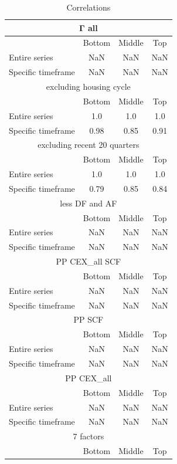 \begin{table}[h!]
\centering
\caption{Correlations}
\begin{tabular}{|l|c|c|c|}
\hline
\multicolumn{4}{|c|}{Γ all} \\ \hline
& Bottom & Middle & Top \\ \hline
Entire series & NaN & NaN & NaN \\ \hline
Specific timeframe & NaN & NaN & NaN \\ \hline
\multicolumn{4}{|c|}{excluding housing cycle} \\ \hline
& Bottom & Middle & Top \\ \hline
Entire series & 1.0 & 1.0 & 1.0 \\ \hline
Specific timeframe & 0.98 & 0.85 & 0.91 \\ \hline
\multicolumn{4}{|c|}{excluding recent 20 quarters} \\ \hline
& Bottom & Middle & Top \\ \hline
Entire series & 1.0 & 1.0 & 1.0 \\ \hline
Specific timeframe & 0.79 & 0.85 & 0.84 \\ \hline
\multicolumn{4}{|c|}{less DF and AF} \\ \hline
& Bottom & Middle & Top \\ \hline
Entire series & NaN & NaN & NaN \\ \hline
Specific timeframe & NaN & NaN & NaN \\ \hline
\multicolumn{4}{|c|}{PP CEX_all SCF} \\ \hline
& Bottom & Middle & Top \\ \hline
Entire series & NaN & NaN & NaN \\ \hline
Specific timeframe & NaN & NaN & NaN \\ \hline
\multicolumn{4}{|c|}{PP SCF} \\ \hline
& Bottom & Middle & Top \\ \hline
Entire series & NaN & NaN & NaN \\ \hline
Specific timeframe & NaN & NaN & NaN \\ \hline
\multicolumn{4}{|c|}{PP CEX_all} \\ \hline
& Bottom & Middle & Top \\ \hline
Entire series & NaN & NaN & NaN \\ \hline
Specific timeframe & NaN & NaN & NaN \\ \hline
\multicolumn{4}{|c|}{7 factors} \\ \hline
& Bottom & Middle & Top \\ \hline

\end{tabular}
\end{table}
